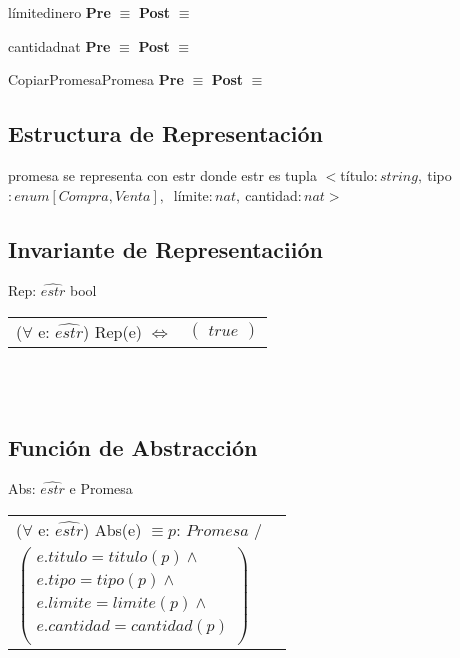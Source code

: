 	\begin{interfaz}{l\'imite}{}{dinero}{}
	\textbf{Pre} $\equiv$ 
	\textbf{Post} $\equiv$
	\end{interfaz}
	
	\begin{interfaz}{cantidad}{}{nat}{}
	\textbf{Pre} $\equiv$ 
	\textbf{Post} $\equiv$ 
	\end{interfaz}

	\begin{interfaz}{CopiarPromesa}{}{Promesa}{}
	\textbf{Pre} $\equiv$ 
	\textbf{Post} $\equiv$ 
	\end{interfaz}


\subsection{Estructura de Representaci\'on}
	promesa se representa con estr\newline
	donde estr es tupla
		$<$t\'itulo$: string, 
		\ $tipo$: enum [Compra, Venta], \ $ l\'imite$: nat, \ $cantidad$: nat>$ \\


\subsection{Invariante de Representacii\'on}

	\noindent Rep: $\widehat{estr}$ \en bool\\
	\begin{tabular}[t]{@{} r @{} @{} l @{}}
	($\forall$ e: $\widehat{estr}$) Rep(e) $\Leftrightarrow$&
	$				
	\left(
	\begin{array}{l}
true
	\end{array} 
	\right)$\\
	\end{tabular}\\\\


\subsection{Funci\'on de Abstracci\'on}

	\noindent Abs: $\widehat{estr}$ e \en Promesa\\
	\begin{tabular}[t]{@{} l @{} @{} l @{}}
	($\forall$ e: $\widehat{estr}$) Abs(e) $\equiv $$p$: $Promesa$ /  \\
	$\left(
	\begin{array}{l}
	e.titulo = titulo(p) \wedge  \\
	e.tipo = tipo(p) \wedge \\
	e.limite = limite(p) \wedge  \\
	e.cantidad= cantidad(p)  \\
	\end{array} 
	\right)$\\
	\end{tabular}\\\\


